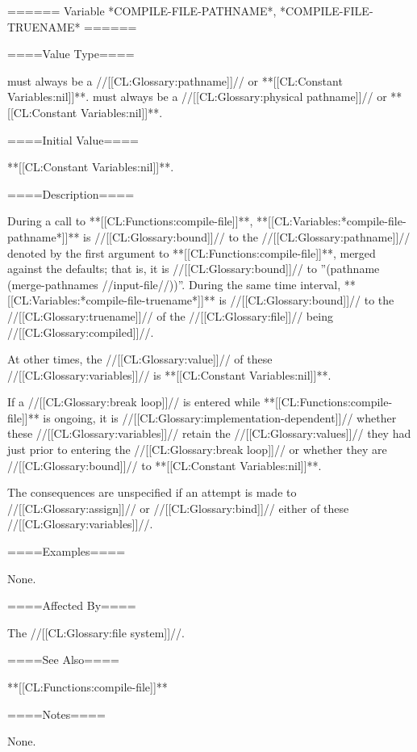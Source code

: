 ====== Variable *COMPILE-FILE-PATHNAME*, *COMPILE-FILE-TRUENAME* ======

====Value Type====

 must always be a //[[CL:Glossary:pathname]]// or **[[CL:Constant Variables:nil]]**.  must always be a //[[CL:Glossary:physical pathname]]// or **[[CL:Constant Variables:nil]]**.

====Initial Value====

**[[CL:Constant Variables:nil]]**.

====Description====

During a call to **[[CL:Functions:compile-file]]**, **[[CL:Variables:*compile-file-pathname*]]** is //[[CL:Glossary:bound]]// to the //[[CL:Glossary:pathname]]// denoted by the first argument to **[[CL:Functions:compile-file]]**, merged against the defaults; that is, it is //[[CL:Glossary:bound]]// to ''(pathname (merge-pathnames //input-file//))''. During the same time interval, **[[CL:Variables:*compile-file-truename*]]** is //[[CL:Glossary:bound]]// to the //[[CL:Glossary:truename]]// of the //[[CL:Glossary:file]]// being //[[CL:Glossary:compiled]]//.

At other times, the //[[CL:Glossary:value]]// of these //[[CL:Glossary:variables]]// is **[[CL:Constant Variables:nil]]**.

If a //[[CL:Glossary:break loop]]// is entered while **[[CL:Functions:compile-file]]** is ongoing, it is //[[CL:Glossary:implementation-dependent]]// whether these //[[CL:Glossary:variables]]// retain the //[[CL:Glossary:values]]// they had just prior to entering the //[[CL:Glossary:break loop]]// or whether they are //[[CL:Glossary:bound]]// to **[[CL:Constant Variables:nil]]**.

The consequences are unspecified if an attempt is made to //[[CL:Glossary:assign]]// or //[[CL:Glossary:bind]]// either of these //[[CL:Glossary:variables]]//.

====Examples====

None.

====Affected By====

The //[[CL:Glossary:file system]]//.

====See Also====

**[[CL:Functions:compile-file]]**

====Notes====

None.

